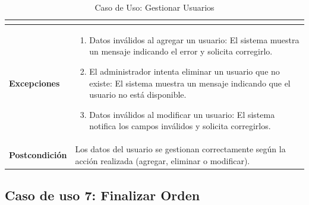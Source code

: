 \documentclass{article}
\begin{document}
\begin{table}[H]
\begin{tabular}{|p{4cm}|p{11cm}|}
\begin{enumerate}
\begin{itemize}
        \end{itemize}
    \end{enumerate} \\ \hline
    \textbf{Excepciones}        & 
    \begin{enumerate}
        \item Datos inválidos al agregar un usuario: El sistema muestra un mensaje indicando el error y solicita corregirlo.
        \item El administrador intenta eliminar un usuario que no existe: El sistema muestra un mensaje indicando que el usuario no está disponible.
        \item Datos inválidos al modificar un usuario: El sistema notifica los campos inválidos y solicita corregirlos.
    \end{enumerate} \\ \hline
    \textbf{Postcondición}      & Los datos del usuario se gestionan correctamente según la acción realizada (agregar, eliminar o modificar). \\ \hline
    \end{tabular}
    \caption{Caso de Uso: Gestionar Usuarios}
    \label{tab:gestionar_usuarios}
\end{table}


\subsection{Caso de uso 7: Finalizar Orden}
\end{document}
